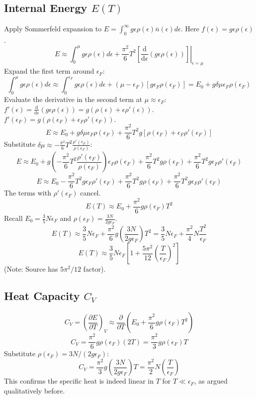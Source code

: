 \documentclass[11pt]{article}
\newcommand{\pderiv}[2]{\frac{\partial #1}{\partial #2}}
\newcommand{\deriv}[2]{\frac{\mathrm{d} #1}{\mathrm{d} #2}}
\newcommand{\eps}{\epsilon}
\newcommand{\nbar}{\overline{n}} %
\newcommand{\ef}{\epsilon_F} %
\begin{document}
\subsection*{Internal Energy $E(T)$}
Apply Sommerfeld expansion to $E = \int_0^\infty g\eps\rho(\eps) \nbar(\eps) d\eps$. Here $f(\eps) = g \eps \rho(\eps)$.
\[ E \approx \int_0^\mu g\eps\rho(\eps) d\eps + \frac{\pi^2}{6} T^2 \left. [ \deriv{}{\eps} (g\eps\rho(\eps)) ] \right|_{\eps=\mu} \]
Expand the first term around $\ef$:
\[ \int_0^\mu g\eps\rho(\eps) d\eps \approx \int_0^{\ef} g\eps\rho(\eps) d\eps + (\mu-\ef) [g\ef\rho(\ef)] = E_0 + g \delta\mu \ef \rho(\ef) \]
Evaluate the derivative in the second term at $\mu \approx \ef$:
$f'(\eps) = \deriv{}{\eps} (g \eps \rho(\eps)) = g(\rho(\eps) + \eps \rho'(\eps))$.
$f'(\ef) = g(\rho(\ef) + \ef \rho'(\ef))$.
\[ E \approx E_0 + g \delta\mu \ef \rho(\ef) + \frac{\pi^2}{6} T^2 g [\rho(\ef) + \ef \rho'(\ef)] \]
Substitute $\delta\mu \approx - \frac{\pi^2}{6} T^2 \frac{\rho'(\ef)}{\rho(\ef)}$:
\[ E \approx E_0 + g \left(-\frac{\pi^2}{6} T^2 \frac{\rho'(\ef)}{\rho(\ef)}\right) \ef \rho(\ef) + \frac{\pi^2}{6} T^2 g \rho(\ef) + \frac{\pi^2}{6} T^2 g \ef \rho'(\ef) \]
\[ E \approx E_0 - \frac{\pi^2}{6} T^2 g \ef \rho'(\ef) + \frac{\pi^2}{6} T^2 g \rho(\ef) + \frac{\pi^2}{6} T^2 g \ef \rho'(\ef) \]
The terms with $\rho'(\ef)$ cancel.
\[ E(T) \approx E_0 + \frac{\pi^2}{6} g \rho(\ef) T^2 \]
Recall $E_0 = \frac{3}{5} N \ef$ and $\rho(\ef) = \frac{3N}{2g\ef}$.
\[ E(T) \approx \frac{3}{5} N \ef + \frac{\pi^2}{6} g \left( \frac{3N}{2g\ef} \right) T^2 = \frac{3}{5} N \ef + \frac{\pi^2}{4} N \frac{T^2}{\ef} \]
\[ E(T) \approx \frac{3}{5} N \ef \left[ 1 + \frac{5\pi^2}{12} \left(\frac{T}{\ef}\right)^2 \right] \]
(Note: Source has $5\pi^2/12$ factor).

\subsection*{Heat Capacity $C_V$}
\[ C_V = \left( \pderiv{E}{T} \right)_V \approx \pderiv{}{T} \left( E_0 + \frac{\pi^2}{6} g \rho(\ef) T^2 \right) \]
\[ C_V = \frac{\pi^2}{6} g \rho(\ef) (2T) = \frac{\pi^2}{3} g \rho(\ef) T \]
Substitute $\rho(\ef) = 3N / (2g\ef)$:
\[ C_V = \frac{\pi^2}{3} g \left( \frac{3N}{2g\ef} \right) T = \frac{\pi^2}{2} N \left( \frac{T}{\ef} \right) \]
This confirms the specific heat is indeed linear in $T$ for $T \ll \ef$, as argued qualitatively before.

\appendix
\end{document}
